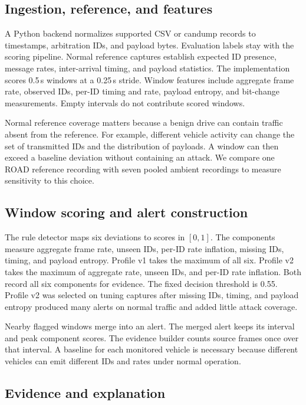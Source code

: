 \documentclass[sigconf,pbalance=true]{acmart}
\begin{document}
\subsection{Ingestion, reference, and features}

A Python backend normalizes supported CSV or candump records to timestamps, arbitration IDs, and payload bytes. Evaluation labels stay with the scoring pipeline. Normal reference captures establish expected ID presence, message rates, inter-arrival timing, and payload statistics. The implementation scores 0.5\,s windows at a 0.25\,s stride. Window features include aggregate frame rate, observed IDs, per-ID timing and rate, payload entropy, and bit-change measurements. Empty intervals do not contribute scored windows.

Normal reference coverage matters because a benign drive can contain traffic absent from the reference. For example, different vehicle activity can change the set of transmitted IDs and the distribution of payloads. A window can then exceed a baseline deviation without containing an attack. We compare one ROAD reference recording with seven pooled ambient recordings to measure sensitivity to this choice.

\subsection{Window scoring and alert construction}

The rule detector maps six deviations to scores in $[0,1]$. The components measure aggregate frame rate, unseen IDs, per-ID rate inflation, missing IDs, timing, and payload entropy. Profile v1 takes the maximum of all six. Profile v2 takes the maximum of aggregate rate, unseen IDs, and per-ID rate inflation. Both record all six components for evidence. The fixed decision threshold is 0.55. Profile v2 was selected on tuning captures after missing IDs, timing, and payload entropy produced many alerts on normal traffic and added little attack coverage.

Nearby flagged windows merge into an alert. The merged alert keeps its interval and peak component scores. The evidence builder counts source frames once over that interval. A baseline for each monitored vehicle is necessary because different vehicles can emit different IDs and rates under normal operation.

\subsection{Evidence and explanation}
\end{document}
